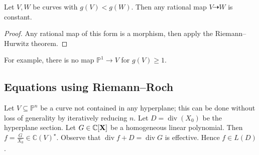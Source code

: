 \begin{corollary}
    Let \( V, W \) be curves with \( g(V) < g(W) \).
    Then any rational map \( V \dashrightarrow W \) is constant.
\end{corollary}
\begin{proof}
    Any rational map of this form is a morphism, then apply the Riemann--Hurwitz theorem.
\end{proof}
For example, there is no map \( \mathbb P^1 \to V \) for \( g(V) \geq 1 \).

\subsection{Equations using Riemann--Roch}
Let \( V \subseteq \mathbb P^n \) be a curve not contained in any hyperplane; this can be done without loss of generality by iteratively reducing \( n \).
Let \( D = \operatorname{div}(X_0) \) be the hyperplane section.
Let \( G \in \mathbb C[\vb X] \) be a homogeneous linear polynomial.
Then \( f = \frac{G}{X_0} \in \mathbb C(V)^\star \).
Observe that \( \operatorname{div} f + D = \operatorname{div} G \) is effective.
Hence \( f \in L(D) \).


